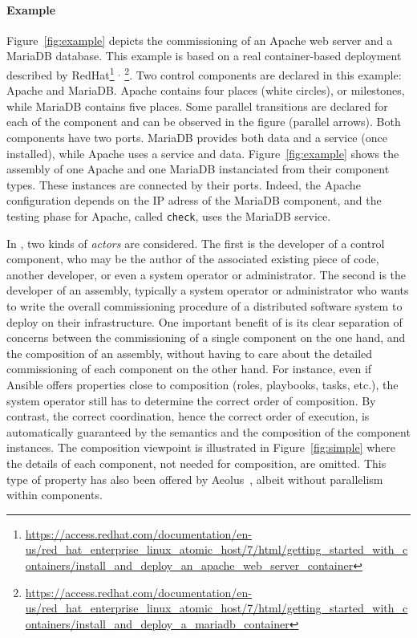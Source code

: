 \paragraph{Example}{ Figure~\ref{fig:example} depicts the \mad
  commissioning of an Apache web server and a MariaDB database. This
  example is based on a real container-based deployment described by
  RedHat\footnote{\url{https://access.redhat.com/documentation/en-us/red_hat_enterprise_linux_atomic_host/7/html/getting_started_with_containers/install_and_deploy_an_apache_web_server_container}}%
  $^,$%
  \footnote{\url{https://access.redhat.com/documentation/en-us/red_hat_enterprise_linux_atomic_host/7/html/getting_started_with_containers/install_and_deploy_a_mariadb_container}}. Two
  \mad control components are declared in this example: Apache and
  MariaDB. Apache contains four places (white circles), or milestones,
  while MariaDB contains five places. Some parallel transitions are
  declared for each of the component and can be observed in the figure
  (parallel arrows). Both components have two ports. MariaDB provides
  both data and a service (once installed), while Apache uses a
  service and data. Figure~\ref{fig:example} shows the assembly of one
  Apache and one MariaDB instanciated from their component
  types. These instances are connected by their ports. Indeed, the
  Apache configuration depends on the IP adress of the MariaDB
  component, and the testing phase for Apache, called \texttt{check},
  uses the MariaDB service.}

In \mad, two kinds of \emph{actors} are considered. The first is the
developer of a control component, who may be the author of the
associated existing piece of code, another developer, or even a system
operator or administrator. The second is the developer of an assembly,
typically a system operator or administrator who wants to write the
overall commissioning procedure of a distributed software system to
deploy on their infrastructure. One important benefit of \mad is its
clear separation of concerns between the commissioning of a single
component on the one hand, and the composition of an assembly, without
having to care about the detailed commissioning of each component on
the other hand. For instance, even if Ansible offers properties close
to composition (\eg roles, playbooks, tasks, etc.), the system
operator still has to determine the correct order of composition. By
contrast, the correct coordination, hence the correct order of
execution, is automatically guaranteed by the \mad semantics and the
composition of the component instances. The composition viewpoint is
illustrated in Figure~\ref{fig:simple} where the details of each
component, not needed for composition, are omitted. This type of
property has also been offered by Aeolus~\cite{dicosmo2014ic}, albeit
without parallelism within components.

